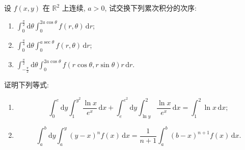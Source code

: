 \documentclass[../../数学分析培优讲义.tex]{subfiles}
\begin{document}
\begin{example}[\markstar]
设 $f(x,y)$ 在 $\mathbb{R}^2$ 上连续, $a>0$, 试交换下列累次积分的次序:
\begin{enumerate}[label=(\arabic*)]
    \item $\displaystyle\int_0^{\frac{\pi}{2}}\mathrm{d}\theta\int_0^{2a\cos\theta}f(r,\theta)\,\mathrm{d}r$;
    \item $\displaystyle\int_0^{\frac{\pi}{4}}\mathrm{d}\theta\int_0^{a\sec\theta}f(r,\theta)\,\mathrm{d}r$;
    \item $\displaystyle\int_{-\frac{\pi}{2}}^{\frac{\pi}{2}}\mathrm{d}\theta\int_0^{2a\cos\theta}f(r\cos\theta,r\sin\theta)r\,\mathrm{d}r$.
\end{enumerate}
\end{example}
\exampleblank

\begin{example}
证明下列等式:
\begin{enumerate}[label=(\arabic*)]
    \item
    \[
        \int_0^e\mathrm{d}y\int_1^{y^2}\dfrac{\ln x}{e^x}\,\mathrm{d}x
        +\int_e^{e^2}\mathrm{d}y\int_{\ln y}^{2}\dfrac{\ln x}{e^x}\,\mathrm{d}x
        =\int_1^2\ln x\,\mathrm{d}x;
    \]
    \item
    \[
        \int_a^b\mathrm{d}y\int_a^y(y-x)^n f(x)\,\mathrm{d}x
        =\dfrac{1}{n+1}\int_a^b(b-x)^{n+1}f(x)\,\mathrm{d}x.
    \]
\end{enumerate}
\end{example}
\exampleblank
\end{document}

